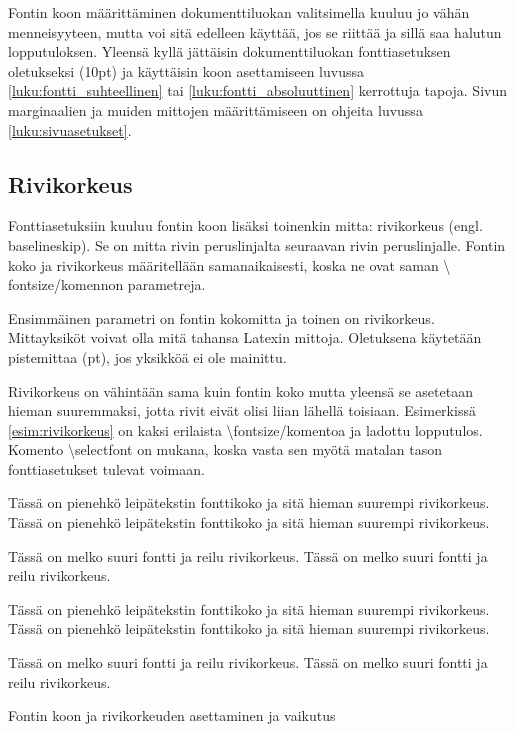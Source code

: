 \documentclass[a4paper,10pt,notitlepage,oneside]{book}
\newcommand{\keno}{\textbackslash}
\newcommand{\koodi}[1]{\textsf{#1}}
\begin{document}
Fontin koon määrittäminen dokumenttiluokan valitsimella kuuluu jo vähän
menneisyyteen, mutta voi sitä edelleen käyttää, jos se riittää ja sillä
saa halutun lopputuloksen. Yleensä kyllä jättäisin dokumenttiluokan
fontti\-asetuksen oletukseksi (\koodi{10pt}) ja käyttäisin koon
asettamiseen luvussa \ref{luku:fontti_suhteellinen} tai
\ref{luku:fontti_absoluuttinen} kerrottuja tapoja. Sivun marginaalien ja
muiden mittojen määrittämiseen on ohjeita luvussa
\ref{luku:sivuasetukset}.

\subsection{Rivikorkeus}

Fontti\-asetuksiin kuuluu fontin koon lisäksi toinenkin mitta:
rivikorkeus (engl. \textenglish{base\-line\-skip}). Se on mitta rivin
peruslinjalta seuraavan rivin peruslinjalle. Fontin koko ja rivikorkeus
määritellään saman\-aikaisesti, koska ne ovat saman \koodi{\keno
  font\-size}\-/komennon parametreja.

\begin{koodilohkosis}
  \fontsize{10pt}{12pt} \selectfont
\end{koodilohkosis}

Ensimmäinen parametri on fontin kokomitta ja toinen on rivikorkeus.
Mitta\-yksiköt voivat olla mitä tahansa Latexin mittoja. Oletuksena
käytetään pistemittaa (pt), jos yksikköä ei ole mainittu.

Rivikorkeus on vähintään sama kuin fontin koko mutta yleensä se
asetetaan hieman suuremmaksi, jotta rivit eivät olisi liian lähellä
toisiaan. Esimerkissä \ref{esim:rivikorkeus} on kaksi erilaista
\koodi{\keno font\-size}\-/komentoa ja ladottu lopputulos. Komento
\koodi{\keno select\-font} on mukana, koska vasta sen myötä matalan
tason fontti\-asetukset tulevat voimaan.

\begin{esimerkki}
\begin{koodilohko}
  \fontsize{10pt}{12pt}\selectfont Tässä on pienehkö leipätekstin
  fonttikoko ja sitä hieman suurempi rivikorkeus. Tässä on pienehkö
  leipätekstin fonttikoko ja sitä hieman suurempi rivikorkeus.

  \fontsize{16pt}{25pt}\selectfont Tässä on melko suuri fontti ja
  reilu rivikorkeus. Tässä on melko suuri fontti ja reilu
  rivikorkeus.
\end{koodilohko}
\centering
\parbox{.9\textwidth}{%
  \linespread{1}
  \fontsize{10pt}{12pt}\selectfont Tässä on pienehkö leipätekstin
  fonttikoko ja sitä hieman suurempi rivikorkeus. Tässä on
  pienehkö leipätekstin fonttikoko ja sitä hieman suurempi
  rivikorkeus.

  \fontsize{16pt}{25pt}\selectfont Tässä on melko suuri fontti ja
  reilu rivikorkeus. Tässä on melko suuri fontti ja reilu
  rivikorkeus.
}
\vspace{3ex}
\caption{Fontin koon ja rivikorkeuden asettaminen ja vaikutus}
\label{esim:rivikorkeus}
\end{esimerkki}
\end{document}
